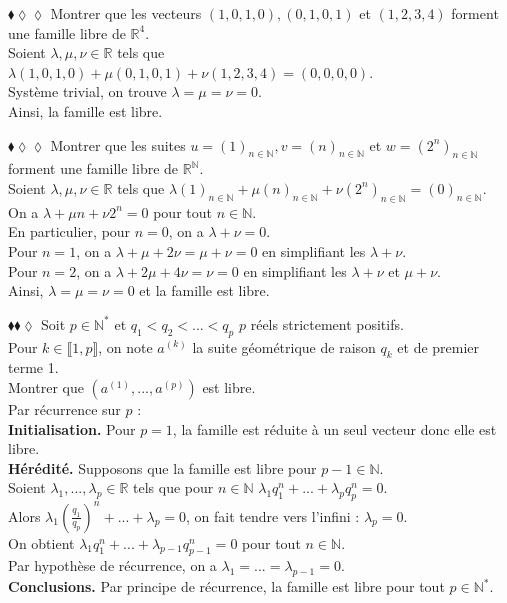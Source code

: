 \documentclass[11pt]{article}
\newcommand*{\R}{\mathbb{R}}
\newcommand*{\N}{\mathbb{N}}
\begin{document}
\begin{exercise}{$\blacklozenge\lozenge\lozenge$}{}
    Montrer que les vecteurs $(1, 0, 1, 0), (0, 1, 0, 1)$ et $(1, 2, 3, 4)$ forment une famille libre de $\R^4$.
    \tcblower\\[0.2cm]
    Soient $\lambda, \mu, \nu \in \R$ tels que $\lambda(1, 0, 1, 0) + \mu(0, 1, 0, 1) + \nu(1, 2, 3, 4) = (0, 0, 0, 0)$.\\
    Système trivial, on trouve $\lambda = \mu = \nu = 0$.\\
    Ainsi, la famille est libre.
\end{exercise}

\begin{exercise}{$\blacklozenge\lozenge\lozenge$}{}
    Montrer que les suites $u=(1)_{n\in\N}, v=(n)_{n\in\N}$ et $w=(2^n)_{n\in\N}$ forment une famille libre de $\R^\N$.
    \tcblower\\[0.2cm]
    Soient $\lambda, \mu, \nu \in \R$ tels que $\lambda(1)_{n\in\N} + \mu(n)_{n\in\N} + \nu(2^n)_{n\in\N} = (0)_{n\in\N}$.\\
    On a $\lambda + \mu n + \nu 2^n = 0$ pour tout $n \in \N$.\\
    En particulier, pour $n = 0$, on a $\lambda + \nu = 0$.\\
    Pour $n = 1$, on a $\lambda + \mu + 2\nu = \mu + \nu = 0$ en simplifiant les $\lambda + \nu$.\\
    Pour $n = 2$, on a $\lambda + 2\mu + 4\nu = \nu = 0$ en simplifiant les $\lambda + \nu$ et $\mu + \nu$.\\
    Ainsi, $\lambda = \mu = \nu = 0$ et la famille est libre.
\end{exercise}

\begin{exercise}{$\blacklozenge\blacklozenge\lozenge$}{}
    Soit $p\in\N^*$ et $q_1<q_2<...<q_p$ $p$ réels strictement positifs.\\
    Pour $k \in \llbracket 1, p \rrbracket$, on note $a^{(k)}$ la suite géométrique de raison $q_k$ et de premier terme 1.\\
    Montrer que $(a^{(1)}, ..., a^{(p)})$ est libre.
    \tcblower\\[0.2cm]
    Par récurrence sur $p$ :\\
    \textbf{Initialisation.} Pour $p = 1$, la famille est réduite à un seul vecteur donc elle est libre.\\
    \textbf{Hérédité.} Supposons que la famille est libre pour $p-1 \in \N$.\\
    Soient $\lambda_1, ..., \lambda_{p} \in \R$ tels que pour $n\in\N$ $\lambda_1q_1^n + ... + \lambda_{p}q_{p}^n = 0$.\\
    Alors $\lambda_1\left(\frac{q_1}{q_{p}}\right)^n + ... + \lambda_p = 0$, on fait tendre vers l'infini : $\lambda_p = 0$.\\
    On obtient $\lambda_1q_1^n + ... + \lambda_{p-1}q_{p-1}^n = 0$ pour tout $n\in\N$.\\
    Par hypothèse de récurrence, on a $\lambda_1 = ... = \lambda_{p-1} = 0$.\\
    \textbf{Conclusions.} Par principe de récurrence, la famille est libre pour tout $p\in\N^*$.
\end{exercise}
\end{document}
